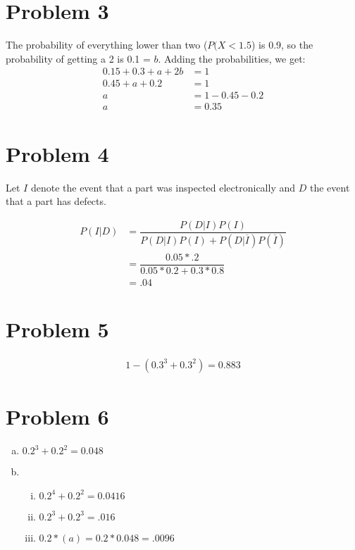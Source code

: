 \documentclass[11pt]{article}
\begin{document}
\section*{Problem 3}
 The probability of everything lower than two ($P(X < 1.5$) is 0.9, so the probability of getting a 2 is 0.1 = $b$. Adding the probabilities, we get:
\begin{align*}
 	0.15 + 0.3 + a + 2b &= 1\\
 	0.45 + a + 0.2 &= 1\\
 	a &= 1-0.45 -0.2\\
 	a &= 0.35
\end{align*}

\section*{Problem 4}
Let $I$ denote the event that a part was inspected electronically and $D$ the event that a part has defects.

\begin{align*}
	P(I | D) &= \dfrac{ P(D | I)P(I) }{P(D | I)P(I) + P(D | \overline{I} )P(\overline{I})}\\
	&= \dfrac{0.05 * .2}{ 0.05 * 0.2 + 0.3 * 0.8}\\
	&= .04
\end{align*}

\section*{Problem 5}
\begin{align*}
	1-(0.3^3 + 0.3^2) = 0.883
\end{align*}

\section*{Problem 6}

\begin{enumerate}[(a)]
	\item $0.2 ^3 + 0.2 ^2 = 0.048$
	
	\item 
		\begin{enumerate}[i.]
			\item $0.2^4 + 0.2^2 = 0.0416$
			\item $0.2^3 + 0.2^3 = .016$
			\item $0.2 * (a) = 0.2 * 0.048 = .0096$
		\end{enumerate}
	
\end{enumerate}
\end{document}
